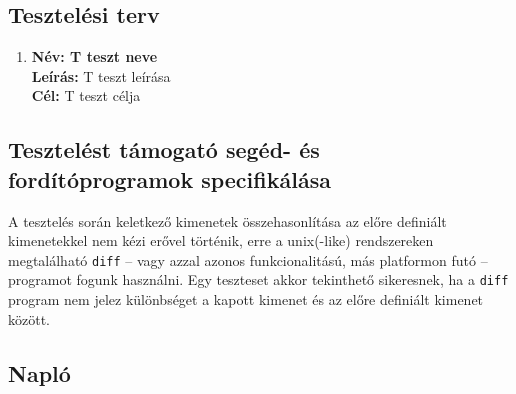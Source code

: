 	    \begin{enumerate}[label=\textbf{\arabic*.}, start=1]
	    \end{enumerate}
	
	\subsection{Tesztelési terv}
		\newcommand{\testitem}[1]{\item \textbf{Név: #1}\\}
		\newcommand{\tdesc}[1]{\textbf{Leírás: } #1\\}
		\newcommand{\tcel}[1]{\textbf{Cél:} #1\\}
	
		\begin{enumerate}[label=\textbf{\arabic*.}, start=1]
		    \testitem{T teszt neve} %
	        \tdesc{T teszt leírása} %
	        \tcel{T teszt célja} %
		\end{enumerate}
	
	\subsection{Tesztelést támogató segéd- és fordítóprogramok specifikálása}		
A tesztelés során keletkező kimenetek összehasonlítása az előre definiált kimenetekkel nem kézi erővel történik, erre a unix(-like) rendszereken megtalálható \texttt{diff} -- vagy azzal azonos funkcionalitású, más platformon futó -- programot fogunk használni. Egy teszteset akkor tekinthető sikeresnek, ha a \texttt{diff} program nem jelez különbséget a kapott kimenet és az előre definiált kimenet között.

	\subsection{Napló}

